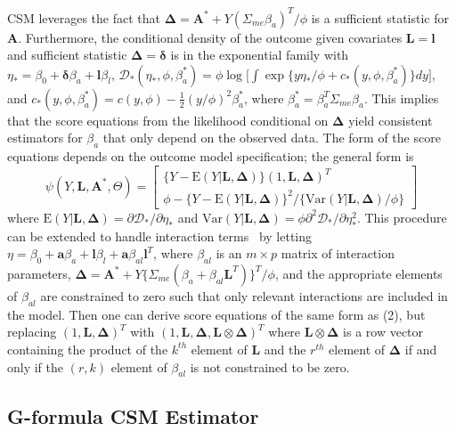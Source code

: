 \documentclass[useAMS,usenatbib,referee]{biom}
\begin{document}
CSM leverages the fact that $\bm{\Delta} = \bm{A}^{*} + Y(\Sigma_{me}\beta_{a})^{T}/\phi$ is a sufficient statistic for $\bm{A}$. Furthermore, the conditional density of the outcome given covariates $\bm{L} = \bm{l}$ and sufficient statistic $\bm{\Delta} = \bm{\delta}$ is in the exponential family with $\eta_{*} = \beta_{0} + \bm{\delta}\beta_{a} + \bm{l}\beta_{l}$, $\mathcal{D}_{*}(\eta_{*}, \phi, \beta_{a}^{*}) = \phi \log \bigg[ \int \exp \{ y\eta_{*}/\phi + c_{*}(y, \phi, \beta_{a}^{*}) \} dy \bigg]$, and $c_{*}(y, \phi, \beta_{a}^{*}) = c(y, \phi) - \frac{1}{2}(y/\phi)^{2}\beta_{a}^{*}$, where $\beta_{a}^{*} = \beta_{a}^{T}\Sigma_{me}\beta_{a}$. This implies that the score equations from the likelihood conditional on $\bm{\Delta}$ yield consistent estimators for $\beta_{a}$ that only depend on the observed data. The form of the score equations depends on the outcome model specification; the general form is
\begin{equation}
    \psi(Y, \bm{L}, \bm{A}^{*}, \Theta) =
    \begin{bmatrix}
       \{ Y - \text{E}(Y | \bm{L}, \bm{\Delta}) \} (1, \bm{L}, \bm{\Delta})^{T} \\
        \phi - \{ Y - \text{E}(Y | \bm{L}, \bm{\Delta}) \}^{2} / \{ \text{Var}(Y | \bm{L}, \bm{\Delta}) / \phi \}
    \end{bmatrix}
\end{equation}
where $\text{E}(Y | \bm{L}, \bm{\Delta}) = \partial \mathcal{D}_{*} / \partial \eta_{*}$ and $\text{Var}(Y | \bm{L}, \bm{\Delta}) = \phi \partial^{2} \mathcal{D}_{*} / \partial \eta^{2}_{*}$. This procedure can be extended to handle interaction terms~\citep{dagalp2001} by letting $\eta = \beta_{0} + \bm{a}\beta_{a} + \bm{l}\beta_{l} + \bm{a}\beta_{al}\bm{l}^{T}$, where $\beta_{al}$ is an $m \times p$ matrix of interaction parameters, $\bm{\Delta} = \bm{A}^{*} + Y\{ \Sigma_{me}(\beta_{a} + \beta_{al}\bm{L}^{T}) \}^{T}/\phi$, and the appropriate elements of $\beta_{al}$ are constrained to zero such that only relevant interactions are included in the model. Then one can derive score equations of the same form as (2), but replacing $(1, \bm{L}, \bm{\Delta})^{T}$ with $(1, \bm{L}, \bm{\Delta}, \bm{L} \otimes \bm{\Delta})^{T}$ where $\bm{L} \otimes \bm{\Delta}$ is a row vector containing the product of the $k^{th}$ element of $\bm{L}$ and the $r^{th}$ element of $\bm{\Delta}$ if and only if the $(r, k)$ element of $\beta_{al}$ is not constrained to be zero.

\subsection{G-formula CSM Estimator}
\end{document}
